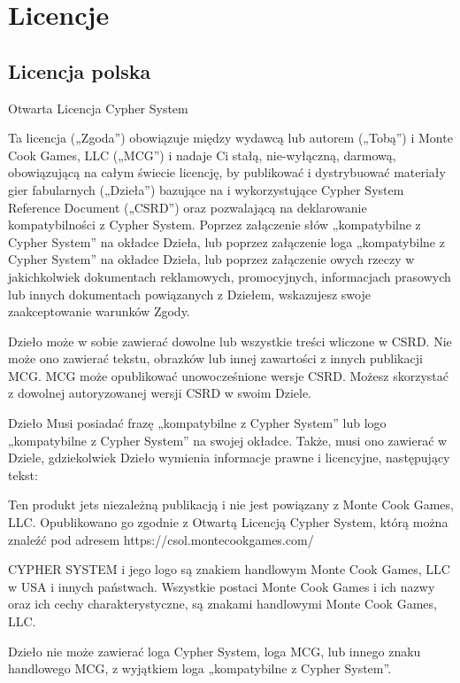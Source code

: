 \chapter{Licencje}

\section{Licencja polska}

Otwarta Licencja Cypher System

Ta licencja („Zgoda”) obowiązuje między wydawcą lub autorem („Tobą”) i Monte Cook Games, LLC („MCG”) i nadaje Ci stałą, nie-wyłączną, darmową, obowiązującą na całym świecie licencję, by publikować i dystrybuować materiały gier fabularnych („Dzieła”) bazujące na i wykorzystujące Cypher System Reference Document („CSRD”) oraz pozwalającą na deklarowanie kompatybilności z Cypher System. Poprzez załączenie słów „kompatybilne z Cypher System” na okładce Dzieła, lub poprzez załączenie loga „kompatybilne z Cypher System” na okładce Dzieła, lub poprzez załączenie owych rzeczy w jakichkolwiek dokumentach reklamowych, promocyjnych, informacjach prasowych lub innych dokumentach powiązanych z Dziełem, wskazujesz swoje zaakceptowanie warunków Zgody.

Dzieło może w sobie zawierać dowolne lub wszystkie treści wliczone w CSRD. Nie może ono zawierać tekstu, obrazków lub innej zawartości z innych publikacji MCG. MCG może opublikować unowocześnione wersje CSRD. Możesz skorzystać z dowolnej autoryzowanej wersji CSRD w swoim Dziele.

Dzieło Musi posiadać frazę „kompatybilne z Cypher System” lub logo „kompatybilne z Cypher System” na swojej okładce. Także, musi ono zawierać w Dziele, gdziekolwiek Dzieło wymienia informacje prawne i licencyjne, następujący tekst:

\begin{displayquote}
Ten produkt jets niezależną publikacją i nie jest powiązany z Monte Cook Games, LLC. Opublikowano go zgodnie z Otwartą Licencją Cypher System, którą można znaleźć pod adresem https://csol.montecookgames.com/ 

CYPHER SYSTEM i jego logo są znakiem handlowym Monte Cook Games, LLC w USA i innych państwach. Wszystkie postaci Monte Cook Games i ich nazwy oraz ich cechy charakterystyczne, są znakami handlowymi Monte Cook Games, LLC.
\end{displayquote}

Dzieło nie może zawierać loga Cypher System, loga MCG, lub innego znaku handlowego MCG, z wyjątkiem loga „kompatybilne z Cypher System”.

